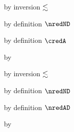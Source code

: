 {\begin{lamportproof*}
    \begin{pfproof}
        \begin{pfproof}
          by inversion $\lesssim$
        \end{pfproof}
        \begin{pfproof}
          by definition $\nredND$
        \end{pfproof}
        \begin{pfproof}
          by definition $\credA$
        \end{pfproof}
      \qedstep
        \begin{pfproof}
          by 
        \end{pfproof}
    \end{pfproof}

    \begin{pfproof}
        \begin{pfproof}
          by inversion $\lesssim$
        \end{pfproof}
        \begin{pfproof}
          by definition $\nredND$
        \end{pfproof}
        \begin{pfproof}
          by definition $\nredAD$
        \end{pfproof}
      \qedstep
        \begin{pfproof}
          by 
        \end{pfproof}
    \end{pfproof}


\end{lamportproof*}}

